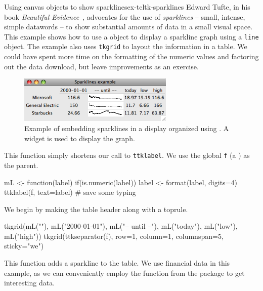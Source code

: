 \begin{example}{Using canvas objects to show sparklines}{ex-tcltk-sparklines}
Edward Tufte, in his book \textit{Beautiful
  Evidence}~\cite{Tufte:Beautiful-Evidence}, advocates for the use of
\textit{sparklines} -- small, intense, simple datawords -- to show substantial
amounts of data in a small visual space. This example shows how to use
a  object to display a sparkline graph using a \texttt{line} object. The example also uses \texttt{tkgrid}
to layout the information in a  table. We could have spent more time on the
formatting of the numeric values and factoring out the data download, but leave improvements as an exercise.


\begin{figure}
  \centering
  \includegraphics[width=0.66\textwidth]{fig-tcltk-sparklines.png}
  \caption{Example of embedding sparklines in a display organized
    using . A  widget is used to display
    the graph.}
  \label{fig:fig-tcltk-sparklines}
\end{figure}


This function simply shortens our call to \texttt{ttklabel}. We use the global \texttt{f} (a ) as the parent.
\begin{Schunk}
\begin{Sinput}
 mL <- function(label) {
   if(is.numeric(label))
     label <- format(label, digits=4)
   ttklabel(f, text=label) # save some typing
 }
\end{Sinput}
\end{Schunk}
We begin by making the table header along with a toprule.
\begin{Schunk}
\begin{Sinput}
 tkgrid(mL(""), mL("2000-01-01"), mL("-- until --"), 
        mL("today"), mL("low"), mL("high"))
 tkgrid(ttkseparator(f), row=1, column=1, columnspan=5, sticky="we")
\end{Sinput}
\end{Schunk}

This function adds a sparkline to the table. We use financial data in
this example, as we can conveniently employ the
 function from the  package to
get interesting data.
\begin{Schunk}
\end{Schunk}
\end{example}
